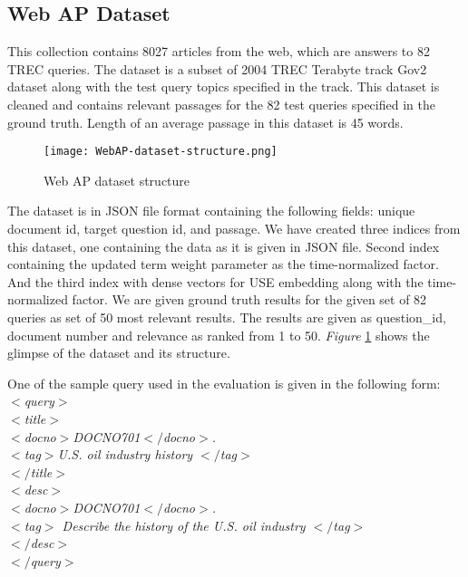 \subsection{Web AP Dataset} 

\cite{RN30, RN31} This collection contains 8027 articles from the web, which are answers to 82 TREC queries. The dataset is a subset of 2004 TREC Terabyte track Gov2 dataset \cite{clarke2004overview} along with the test query topics specified in the track. This dataset is cleaned and contains relevant passages for the 82 test queries specified in the ground truth. Length of an average passage in this dataset is 45 words.
\begin{figure}[h!]
    \centering
    \texttt{[image: WebAP-dataset-structure.png]}
    \caption{Web AP dataset structure }
    \label{fig:web-ap-dataset}
\end{figure}

The dataset is in JSON file format containing the following fields: unique document id, target question id, and passage. We have created three indices from this dataset, one containing the data as it is given in JSON file. Second index containing the updated term weight parameter as the time-normalized factor. And the third index with dense vectors for USE embedding along with the time-normalized factor. We are given ground truth results for the given set of 82 queries as set of 50 most relevant results. The results are given as question\_id, document number and relevance as ranked from 1 to 50. \textit{Figure} \ref{fig:web-ap-dataset} shows the glimpse of the dataset and its structure.

One of the sample query used in the evaluation is given in the following form: \\
\textit{
$<$query$>$	\\	
$<$title$>$\\	
$<$docno$>$DOCNO701$</$docno$>$.\\
$<$tag$>$U.S. oil industry history $</$tag$>$\\
$</$title$>$\\	
$<$desc$>$\\	
$<$docno$>$DOCNO701$</$docno$>$.\\
$<$tag$>$ Describe the history of the U.S. oil industry $</$tag$>$\\
$</$desc$>$	\\
$</$query$>	$\\	
}


